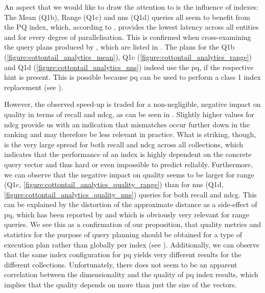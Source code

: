 An aspect that we would like to draw the attention to is the influence of indexes: The Mean (Q1b), Range (Q1c) and \acrshort{nns} (Q1d) queries all seem to benefit from the PQ index, which, according to , provides the lowest latency across all entities and for every degree of parallelisation. This is confirmed when cross-examining the query plans produced by \cottontail{}, which are listed in . The plans for the Q1b (\ref{figure:cottontail_analytics_mean}), Q1c (\ref{figure:cottontail_analytics_range}) and Q1d (\ref{figure:cottontail_analytics_nns}) indeed use the \acrshort{pq}, if the respective hint is present. This is possible because \acrshort{pq} can be used to perform a class 1 index replacement (see ). 

However, the observed speed-up is traded for a non-negligible, negative impact on quality in terms of recall and \acrshort{ndcg}, as can be seen in . Slightly higher values for \acrshort{ndcg} provide us with an indication that mismatches occur further down in the ranking and may therefore be less relevant in practice. What is striking, though, is the very large spread for both recall and \acrshort{ndcg} across all collections, which indicates that the performance of an index is highly dependent on the concrete query vector and thus hard or even impossible to predict reliably. Furthermore, we can observe that the negative impact on quality seems to be larger for range (Q1c, \ref{figure:cottontail_analytics_quality_range}) than for \acrshort{nns} (Q1d, \ref{figure:cottontail_analytics_quality_nns}) queries for both recall and \acrshort{ndcg}. This can be explained by the distortion of the approximate distance as a side-effect of \acrshort{pq}, which has been reported by \cite{Jegou:2010Product} and which is obviously very relevant for range queries. We see this as a confirmation of our proposition, that quality metrics and statistics for the purpose of query planning should be obtained for a type of execution plan rather than globally per index (see ). Additionally, we can observe that the same index configuration for \acrshort{pq} yields very different results for the different collections. Unfortunately, there does not seem to be an apparent correlation between the dimensionality and the quality of \acrshort{pq} index results, which implies that the quality depends on more than just the size of the vectors.

